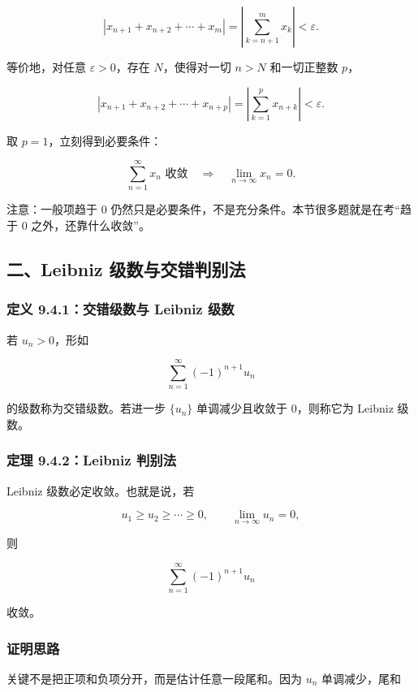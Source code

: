 \[
      \left|x_{n+1}+x_{n+2}+\cdots+x_m\right|
      =
      \left|\sum_{k=n+1}^{m}x_k\right|
      <\varepsilon.
    \]

等价地，对任意 \(\varepsilon>0\)，存在 \(N\)，使得对一切 \(n>N\) 和一切正整数 \(p\)，

\[
      \left|x_{n+1}+x_{n+2}+\cdots+x_{n+p}\right|
      =
      \left|\sum_{k=1}^{p}x_{n+k}\right|
      <\varepsilon.
    \]

取 \(p=1\)，立刻得到必要条件：

\[
      \sum_{n=1}^{\infty}x_n\text{ 收敛}\quad\Longrightarrow\quad
      \lim_{n\to\infty}x_n=0.
    \]

\begin{notebox}
注意：一般项趋于 \(0\) 仍然只是必要条件，不是充分条件。本节很多题就是在考“趋于 0 之外，还靠什么收敛”。
\end{notebox}

\subsection*{二、Leibniz 级数与交错判别法}

\subsubsection*{定义 9.4.1：交错级数与 Leibniz 级数}

若 \(u_n>0\)，形如

\[
      \sum_{n=1}^{\infty}(-1)^{n+1}u_n
    \]

的级数称为交错级数。若进一步 \(\{u_n\}\) 单调减少且收敛于 \(0\)，则称它为 Leibniz 级数。

\subsubsection*{定理 9.4.2：Leibniz 判别法}

Leibniz 级数必定收敛。也就是说，若

\[
      u_1\ge u_2\ge \cdots \ge 0,\qquad \lim_{n\to\infty}u_n=0,
    \]

则

\[
      \sum_{n=1}^{\infty}(-1)^{n+1}u_n
    \]

收敛。

\subsubsection*{证明思路}

关键不是把正项和负项分开，而是估计任意一段尾和。因为 \(u_n\) 单调减少，尾和

